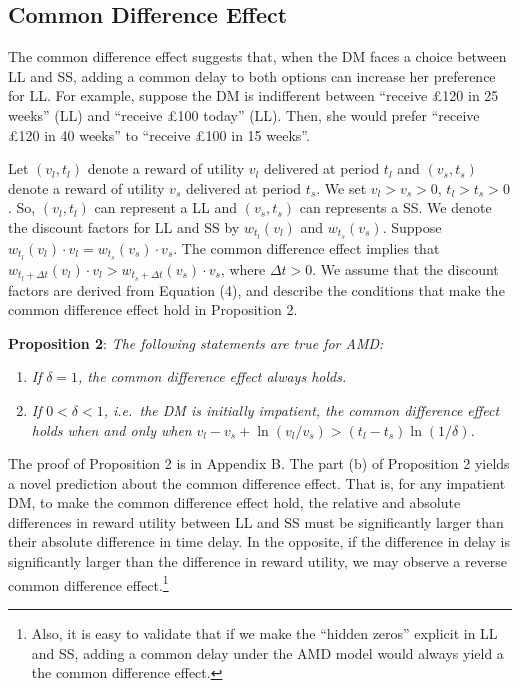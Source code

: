 \documentclass[
  12pt,
]{article}
\begin{document}
\hypertarget{common-difference-effect}{%
\subsection{Common Difference Effect}\label{common-difference-effect}}

The common difference effect \citep{loewenstein1992anomalies} suggests
that, when the DM faces a choice between LL and SS, adding a common
delay to both options can increase her preference for LL. For example,
suppose the DM is indifferent between ``receive £120 in 25 weeks'' (LL)
and ``receive £100 today'' (LL). Then, she would prefer ``receive £120
in 40 weeks'' to ``receive £100 in 15 weeks''.

Let \((v_l,t_l)\) denote a reward of utility \(v_l\) delivered at period
\(t_l\) and \((v_s,t_s)\) denote a reward of utility \(v_s\) delivered
at period \(t_s\). We set \(v_l>v_s>0\), \(t_l>t_s>0\). So,
\((v_l,t_l)\) can represent a LL and \((v_s,t_s)\) can represents a SS.
We denote the discount factors for LL and SS by \(w_{t_l}(v_l)\) and
\(w_{t_s}(v_s)\). Suppose
\(w_{t_l}(v_l)\cdot v_l = w_{t_s}(v_s)\cdot v_s\). The common difference
effect implies that
\(w_{t_l+\Delta t}(v_l)\cdot v_l > w_{t_s+\Delta t}(v_s)\cdot v_s\),
where \(\Delta t >0\). We assume that the discount factors are derived
from Equation (4), and describe the conditions that make the common
difference effect hold in Proposition 2.

\noindent \textbf{Proposition 2}: \emph{The following statements are
true for AMD:}

\begin{enumerate}
\def\labelenumi{(\alph{enumi})}
\item
  \emph{If} \(\delta=1\)\emph{, the common difference effect always
  holds.}
\item
  \emph{If} \(0<\delta<1\)\emph{, i.e.~the DM is initially impatient,
  the common difference effect holds when and only when}
  \(v_l-v_s+\ln(v_l/v_s)>(t_l-t_s)\ln(1/\delta)\)\emph{.}
\end{enumerate}

The proof of Proposition 2 is in Appendix B. The part (b) of Proposition
2 yields a novel prediction about the common difference effect. That is,
for any impatient DM, to make the common difference effect hold, the
relative and absolute differences in reward utility between LL and SS
must be significantly larger than their absolute difference in time
delay. In the opposite, if the difference in delay is significantly
larger than the difference in reward utility, we may observe a reverse
common difference effect.\footnote{Also, it is easy to validate that if
  we make the ``hidden zeros'' explicit in LL and SS, adding a common
  delay under the AMD model would always yield a the common difference
  effect.}
\end{document}
